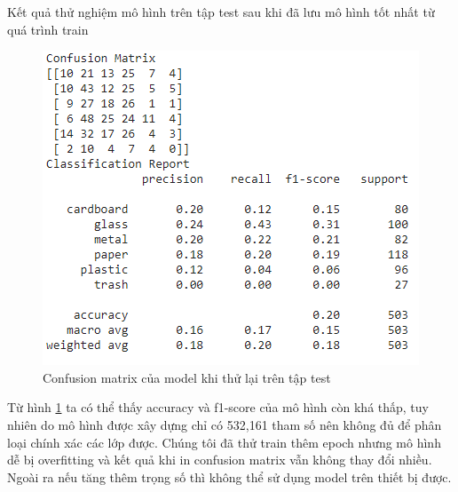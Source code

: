 Kết quả thử nghiệm mô hình trên tập test sau khi đã lưu mô hình tốt nhất từ quá trình train 
\begin{figure}[ht]
    \centering
    \includegraphics[width=\linewidth]{images/matrix.png}
    \caption{ Confusion matrix của model khi thử lại trên tập test}
    \label{fig:matrix}
\end{figure}
Từ hình \ref{fig:matrix} ta có thể thấy accuracy và f1-score của mô hình còn khá thấp, tuy nhiên do mô hình được xây dựng chỉ có 532,161 tham số nên không đủ để phân loại chính xác các lớp được. Chúng tôi đã thử train thêm epoch nhưng mô hình dễ bị overfitting và kết quả khi in confusion matrix vẫn không thay đổi nhiều. Ngoài ra nếu tăng thêm trọng số thì không thể sử dụng model trên thiết bị được.
